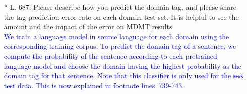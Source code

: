 \documentclass[12pt,times,a4paper,twoside]{article}
\newcommand{\fyTodo}[1]{\Todo[FY:]{\textcolor{orange}{#1}}}
\theoremstyle{definition}
\newcommand{\domain}[1]{\texttt{\textsc{#1}}}
\begin{document}
\begin{itemize}
\item[*] L. 687: Please describe how you predict the domain tag, and please share the tag prediction error rate on each domain test set. It is helpful to see the amount and the impact of the error on MDMT results.
\\
\textcolor{blue}{We train a language model in source language for each domain using the corresponding training corpus. To predict the domain tag of a sentence, we compute the probability of the sentence according to each pretrained language model and choose the domain having the highest probability as the domain tag for that sentence. Note that this classifier is only used for the \domain{news} test data. This is now explained in footnote lines~739-743.}\fyTodo{to compute error rate of domain prediction over each test set, check comment, add footnote number.}
\end{itemize}
\end{document}
